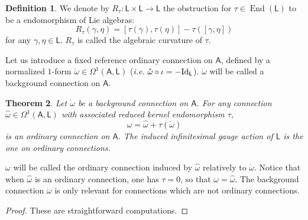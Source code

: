\documentclass[number]{elsarticle}
\newtheorem{theorem}{Theorem}[section]
\theoremstyle{definition}
\newtheorem{definition}[theorem]{Definition}
\theoremstyle{remark}
\numberwithin{equation}{section}
\begin{document}
\begin{definition}
We denote by $R_{\tau} : {{{{\mathbf{\mathsf{{L}}}}}}} \times {{{{\mathbf{\mathsf{{L}}}}}}} \rightarrow {{{{\mathbf{\mathsf{{L}}}}}}}$ the obstruction for ${\tau}\in\operatorname{End}({{{{\mathbf{\mathsf{{L}}}}}}})$ to be a endomorphism of Lie algebras: 
\begin{equation}
R_{\tau}(\gamma,\eta) = [ {\tau}(\gamma) , {\tau}(\eta) ] - {\tau}([\gamma,\eta])
\end{equation}
for any $\gamma, \eta \in {{{{\mathbf{\mathsf{{L}}}}}}}$. $R_{\tau}$ is called the algebraic curvature of ${\tau}$.
\end{definition}

Let us introduce a fixed reference ordinary connection on ${{{{\mathbf{\mathsf{{A}}}}}}}$, defined by a normalized $1$-form ${{\mathring{{\omega}}}}\in \Omega^1({{{{\mathbf{\mathsf{{A}}}}}}},{{{{\mathbf{\mathsf{{L}}}}}}})$ (\textsl{i.e.} ${{\mathring{{\omega}}}} \circ \iota = - {{\text{\textup{Id}}}}_{{{{\mathbf{\mathsf{{L}}}}}}}$). ${{\mathring{{\omega}}}}$ will be called a background connection on ${{{{\mathbf{\mathsf{{A}}}}}}}$.

\begin{theorem}
\label{inducedconnection}
Let ${{\mathring{{\omega}}}}$ be a background connection on ${{{{\mathbf{\mathsf{{A}}}}}}}$.
For any connection ${\widehat{\omega}} \in \Omega^1({{{{\mathbf{\mathsf{{A}}}}}}},{{{{\mathbf{\mathsf{{L}}}}}}})$ with associated reduced kernel endomorphism ${\tau}$,
\begin{equation}
\label{eq-decompositionconnectiononeform}
\omega = {\widehat{\omega}} + {\tau}({{\mathring{{\omega}}}})
\end{equation}
is an ordinary connection on ${{{{\mathbf{\mathsf{{A}}}}}}}$. The induced infinitesimal gauge action of ${{{{\mathbf{\mathsf{{L}}}}}}}$ is the one on ordinary connections.
\end{theorem}

$\omega$ will be called the ordinary connection induced by ${\widehat{\omega}}$ relatively to ${{\mathring{{\omega}}}}$. Notice that when ${\widehat{\omega}}$ is an ordinary connection, one has ${\tau} = 0$, so that $\omega = {\widehat{\omega}}$. The background connection ${{\mathring{{\omega}}}}$ is only relevant for connections which are not ordinary connections.

\begin{proof}
These are straightforward computations.
\end{proof}
\end{document}
